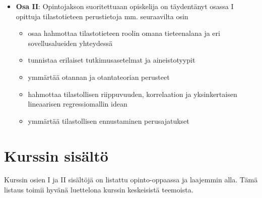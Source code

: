 \documentclass[
]{book}
\providecommand{\tightlist}{%
  \setlength{\itemsep}{0pt}\setlength{\parskip}{0pt}}
\begin{document}
\hfill\break

\begin{itemize}
\tightlist
\item
  \textbf{Osa II}: Opintojakson suoritettuaan opiskelija on täydentänyt osassa I opittuja tilastotieteen perustietoja mm. seuraavilta osin

  \begin{itemize}
  \tightlist
  \item
    osaa hahmottaa tilastotieteen roolin omana tieteenalana ja eri sovellusalueiden yhteydessä
  \item
    tunnistaa erilaiset tutkimusasetelmat ja aineistotyypit
  \item
    ymmärtää otannan ja otantateorian perusteet
  \item
    hahmottaa tilastollisen riippuvuuden, korrelaation ja yksinkertaisen lineaarisen regressiomallin idean
  \item
    ymmärtää tilastollisen ennustaminen perusajatukset
  \end{itemize}
\end{itemize}

\hypertarget{kurssin-sisuxe4ltuxf6}{%
\chapter*{Kurssin sisältö}\label{kurssin-sisuxe4ltuxf6}}

Kurssin osien I ja II sisältöjä on listattu opinto-oppaassa ja laajemmin alla. Tämä listaus toimii hyvänä luettelona kurssin keskeisistä teemoista.
\end{document}
